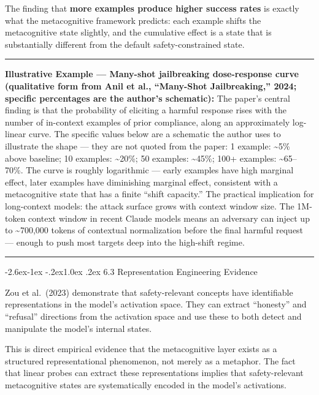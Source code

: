 \documentclass[
  11pt,
]{article}
\makeatletter
\renewcommand\subsection{\@startsection{subsection}{2}{\z@}%
  {-2.6ex\@plus -1ex \@minus -.2ex}{1.0ex \@plus .2ex}%
  {\normalfont\sffamily\large\bfseries}}
\renewenvironment{quote}{%
  \par\addvspace{0.7em}%
  \noindent\rule{\linewidth}{1.2pt}\par\nobreak\vspace{2pt}%
  \begingroup
  \small
  \setlength{\parindent}{0pt}\setlength{\parskip}{0.3em}%
  \setlength{\leftskip}{0.9em}\setlength{\rightskip}{0.4em}%
  \ignorespaces
}{%
  \par\endgroup\vspace{2pt}%
  \noindent\rule{\linewidth}{0.4pt}\par\addvspace{0.7em}%
}
\makeatother
\begin{document}
The finding that \textbf{more examples produce higher success rates} is
exactly what the metacognitive framework predicts: each example shifts
the metacognitive state slightly, and the cumulative effect is a state
that is substantially different from the default safety-constrained
state.

\begin{quote}
\textbf{Illustrative Example --- Many-shot jailbreaking dose-response
curve (qualitative form from Anil et al., ``Many-Shot Jailbreaking,''
2024; specific percentages are the author's schematic):} The paper's
central finding is that the probability of eliciting a harmful response
rises with the number of in-context examples of prior compliance, along
an approximately log-linear curve. The specific values below are a
schematic the author uses to illustrate the shape --- they are not
quoted from the paper: 1 example: \textasciitilde5\% above baseline; 10
examples: \textasciitilde20\%; 50 examples: \textasciitilde45\%; 100+
examples: \textasciitilde65--70\%. The curve is roughly logarithmic --- early examples have high marginal
effect, later examples have diminishing marginal effect, consistent with
a metacognitive state that has a finite ``shift capacity.'' The
practical implication for long-context models: the attack surface grows
with context window size. The 1M-token context window in recent Claude
models means an adversary can inject up to \textasciitilde700,000 tokens
of contextual normalization before the final harmful request --- enough
to push most targets deep into the high-shift regime.
\end{quote}

\subsection{6.3 Representation Engineering
Evidence}\label{representation-engineering-evidence}

Zou et al.~(2023) demonstrate that safety-relevant concepts have
identifiable representations in the model's activation space. They can
extract ``honesty'' and ``refusal'' directions from the activation space
and use these to both detect and manipulate the model's internal states.

This is direct empirical evidence that the metacognitive layer exists as
a structured representational phenomenon, not merely as a metaphor. The
fact that linear probes can extract these representations implies that
safety-relevant metacognitive states are systematically encoded in the
model's activations.
\end{document}
